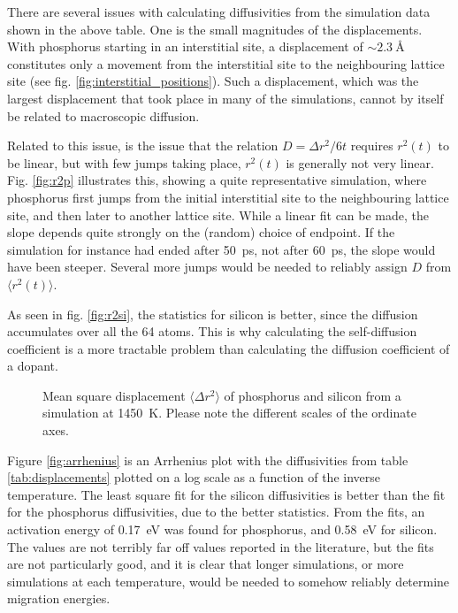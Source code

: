 \documentclass[11pt,bibliography=totoc,index=totoc]{scrbook}   %
\begin{document}
There are several issues with calculating diffusivities from the simulation data shown in the above table.
One is the small magnitudes of the displacements. 
With phosphorus starting in an interstitial site, a displacement of $\sim \SI{2.3}{\angstrom}$ 
constitutes only a movement from the interstitial site to the neighbouring lattice site 
(see fig. \ref{fig:interstitial_positions}). 
Such a displacement, which was the largest displacement that took place in many of the simulations, 
cannot by itself be related to macroscopic diffusion.

Related to this issue, is the issue that the relation $D = \Delta r^2 / 6t$ requires $r^2(t)$ to be linear,
but with few jumps taking place, $r^2(t)$ is generally not very linear.
Fig. \ref{fig:r2p} illustrates this, showing a quite representative simulation, where phosphorus 
first jumps from the initial interstitial site to the neighbouring lattice site, and then later to another lattice site.
While a linear fit can be made, the slope depends quite strongly on the (random) choice of endpoint. 
If the simulation for instance had ended after 50~ps, not after 60~ps, the slope would have been steeper.
Several more jumps would be needed to reliably assign $D$ from $\langle r^2 (t) \rangle$.

As seen in fig. \ref{fig:r2si}, the statistics for silicon is better, since the diffusion accumulates over all the 64 atoms.
This is why calculating the self-diffusion coefficient is a more tractable problem than calculating the diffusion coefficient of a dopant.

\begin{figure}[htbp]
  \centering
    \caption{Mean square displacement $\langle \Delta r^2 \rangle$ of phosphorus and silicon from a simulation at \SI{1450}{\kelvin}. 
        Please note the different scales of the ordinate axes.}
  \label{fig:r2examples}
\end{figure}

Figure \ref{fig:arrhenius} is an Arrhenius plot with the diffusivities from table \ref{tab:displacements} 
plotted on a log scale as a function of the inverse temperature.
The least square fit for the silicon diffusivities is better than the fit for the phosphorus diffusivities, due to the better statistics.
From the fits, an activation energy of 0.17~eV was found for phosphorus, and 0.58~eV for silicon. 
The values are not terribly far off values reported in the literature,
but the fits are not particularly good, 
and it is clear that longer simulations, or more simulations at each temperature, would be needed
to somehow reliably determine migration energies.
\end{document}
